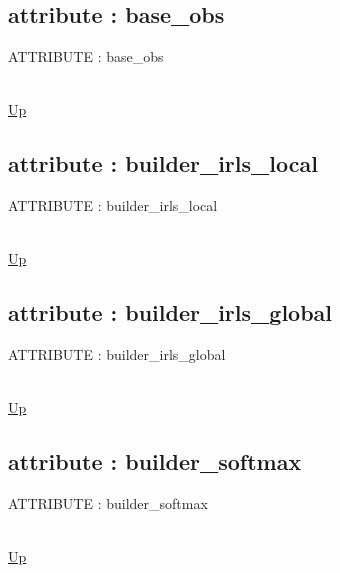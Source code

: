 \subsection*{attribute : base\_obs}
\hypertarget{ecldoc:logisticregression.constants.base_obs}{ATTRIBUTE : base\_obs} \\
\hyperlink{ecldoc:LogisticRegression.Constants}{Up} \\
\par
\subsection*{attribute : builder\_irls\_local}
\hypertarget{ecldoc:logisticregression.constants.builder_irls_local}{ATTRIBUTE : builder\_irls\_local} \\
\hyperlink{ecldoc:LogisticRegression.Constants}{Up} \\
\par
\subsection*{attribute : builder\_irls\_global}
\hypertarget{ecldoc:logisticregression.constants.builder_irls_global}{ATTRIBUTE : builder\_irls\_global} \\
\hyperlink{ecldoc:LogisticRegression.Constants}{Up} \\
\par
\subsection*{attribute : builder\_softmax}
\hypertarget{ecldoc:logisticregression.constants.builder_softmax}{ATTRIBUTE : builder\_softmax} \\
\hyperlink{ecldoc:LogisticRegression.Constants}{Up} \\
\par

